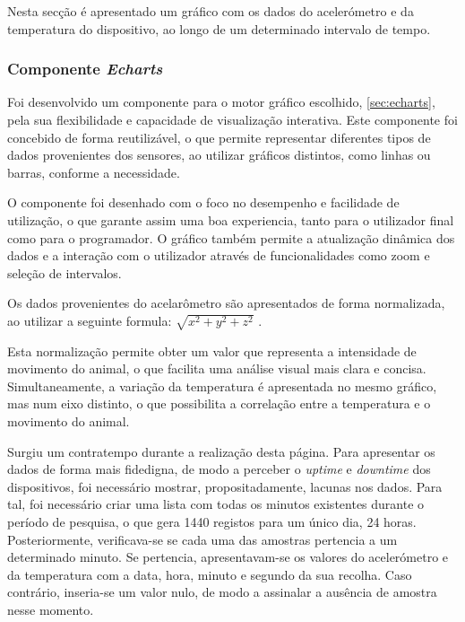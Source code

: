Nesta secção é apresentado um gráfico com os dados do acelerómetro e da temperatura do dispositivo, ao longo de um determinado intervalo de tempo. 

\subsubsection{\textbf{Componente \textit{Echarts}}}
Foi desenvolvido um componente para o motor gráfico escolhido, \autoref{sec:echarts}, pela sua flexibilidade e capacidade de visualização interativa. Este componente foi concebido de forma reutilizável, o que permite representar diferentes tipos de dados provenientes dos sensores, ao utilizar gráficos distintos, como linhas ou barras, conforme a necessidade.   

O componente foi desenhado com o foco no desempenho e facilidade de utilização, o que garante assim uma boa experiencia, tanto para o utilizador final como para o programador. O gráfico também permite a atualização dinâmica dos dados e a interação com o utilizador através de funcionalidades como zoom e seleção de intervalos.

Os dados provenientes do acelarômetro são apresentados de forma normalizada, ao utilizar a seguinte formula:
\begin{math}
	\sqrt{x^2 + y^2 + z^2}
\end{math}
.

Esta normalização permite obter um valor que representa a intensidade de movimento do animal, o que facilita uma análise visual mais clara e concisa. Simultaneamente, a variação da temperatura é apresentada no mesmo gráfico, mas num eixo distinto, o que possibilita a correlação entre a temperatura e o movimento do animal.

Surgiu um contratempo durante a realização desta página. Para apresentar os dados de forma mais fidedigna, de modo a perceber o \textit{uptime} e \textit{downtime} dos dispositivos, foi necessário mostrar, propositadamente, lacunas nos dados. Para tal, foi necessário criar uma lista com todas os minutos existentes durante o período de pesquisa, o que gera 1440 registos para um único dia, 24 horas. Posteriormente, verificava-se se cada uma das amostras pertencia a um determinado minuto. Se pertencia, apresentavam-se os valores do acelerómetro e da temperatura com a data, hora, minuto e segundo da sua recolha. Caso contrário, inseria-se um valor nulo, de modo a assinalar a ausência de amostra nesse momento.

